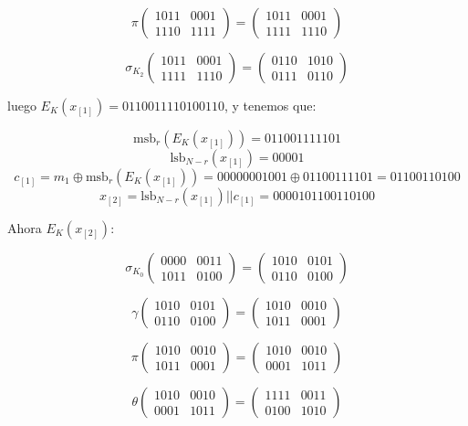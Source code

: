 \documentclass[a4paper]{article}
\begin{document}
$$\pi \begin{pmatrix} 1011 & 0001 \\ 1110 & 1111 \end{pmatrix} = \begin{pmatrix} 1011 & 0001 \\ 1111 & 1110 \end{pmatrix}$$

$$\sigma_{K_2} \begin{pmatrix} 1011 & 0001 \\ 1111 & 1110 \end{pmatrix} = \begin{pmatrix} 0110 & 1010 \\ 0111 & 0110 \end{pmatrix}$$


luego $E_K(x_{[1]}) = 0110 0111 1010 0110$, y tenemos que:

$$\text{msb}_r (E_K(x_{[1]})) = 0110 01111 101$$
$$\text{lsb}_{N-r} (x_{[1]}) = 00001$$
$$c_{[1]} = m_1 \oplus \text{msb}_r(E_K(x_{[1]})) = 0000 0001 001 \oplus 0110 0111 101 = 0110 0110 100$$
$$x_{[2]} = \text{lsb}_{N-r} (x_{[1]}) || c_{[1]} = 0000 1011 0011 0100$$

Ahora $E_K(x_{[2]})$:

$$\sigma_{K_0} \begin{pmatrix} 0000 & 0011 \\ 1011 & 0100 \end{pmatrix} = \begin{pmatrix} 1010 & 0101 \\ 0110 & 0100 \end{pmatrix}$$

$$\gamma \begin{pmatrix} 1010 & 0101 \\ 0110 & 0100 \end{pmatrix} = \begin{pmatrix} 1010 & 0010 \\ 1011 & 0001 \end{pmatrix}$$

$$\pi \begin{pmatrix} 1010 & 0010 \\ 1011 & 0001 \end{pmatrix} = \begin{pmatrix} 1010 & 0010 \\ 0001 & 1011 \end{pmatrix}$$

$$\theta \begin{pmatrix} 1010 & 0010 \\ 0001 & 1011 \end{pmatrix} = \begin{pmatrix} 1111 & 0011 \\ 0100 & 1010 \end{pmatrix}$$
\end{document}
